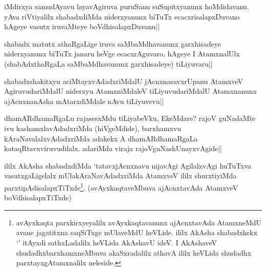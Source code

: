 
\begin{artha} 
iMdirxya samudAyavu layavAgiruva puruSanu suSupitxyanunx hoMdidavanu. 
yAva riVtiyalilx shabadxdiMda niderxyanunx biTuTx ecacxrisalapxDuvano 
hAgeye vasutx iruvaMteye boVdhisalapxDuvanu||
\end{artha}


\begin{artha} 
shabadx matutx athaRgaLige iruva saMbaMdhavanunx garxhisadeye 
niderxyanunx biTuTx janaru heVge ecacxrAguvaro, hAgeye I AtamxnalUlx 
(shabAdxthaRgaLa saMbaMdhavanunx garxhisadeye) tiLiyuvaru||
\end{artha}

\begin{artha} 
shabadxshakitxyu aciMtayxvAdadxriMdalU jAcnxnasavxrUpanu AtamxveV 
AgiruvudariMdalU niderxyu AtamxniMdaleV tiLiyuvudariMdalU 
Atamxnanunx ajAcnxnanAsha mAtarxdiMdale nAvu tiLiyuvevu||
\end{artha}


\begin{artha} 
dhamARdhamaRgaLu rajasesxMdu tiLiyabeVku, EkeMdare? rajoV guNadaMte 
ivu kashamxlavAdadxriMda (hiVgeMdide), barxhamxvu 
kAraNavalalxvAdadxriMda adakekx A dhamARdhamaRgaLa 
kataqRtavxviruvudilalx. adariMda viraja rajoVguNashUnayxvAgide||
\end{artha}


\begin{artha} 
ililx AkAsha shabadxdiMda `tatavxjAcnxnavu nijavAgi AgilalxvAgi 
huTuTxva vasutxgaLigelalx mUlakAraNavAdadxriMda AtamxveV ililx 
shurxtiyiMda parxtipAdisalapxTiTxde\footnote[1]{avAyxkaqta 
parxkirxyeyalilx avAyxkaqtavanunx ajAcnxtavAda AtamxneMdU avane 
jagatitxna saqSiTxge mUlaveMdU heVLide. ililx AkAsha shabadxkekx 
`\stext' itAyxdi sathxLadalilx heVLida AkAshavU ideV. I AkAshaveV 
shudadhxbarxhamxneMbuva akaSxradalilx athavA ililx heVLida shudadhx 
parxtayxgAtamxnalilx neleside.}. (avAyxkaqtaveMbuva 
ajAcnxtavAda AtamxveV boVdhisalapxTiTxde)
\end{artha}


